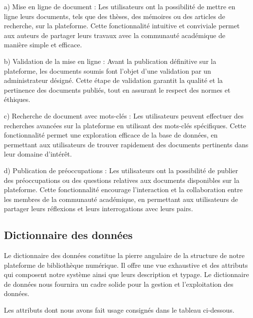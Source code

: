 a) Mise en ligne de document : Les utilisateurs ont la possibilité de mettre en ligne leurs documents, tels que des thèses, des mémoires ou des articles de recherche, sur la plateforme. Cette fonctionnalité intuitive et conviviale permet aux auteurs de partager leurs travaux avec la communauté académique de manière simple et efficace.\par


b) Validation de la mise en ligne : Avant la publication définitive sur la plateforme, les documents soumis font l'objet d'une validation par un administrateur désigné. Cette étape de validation garantit la qualité et la pertinence des documents publiés, tout en assurant le respect des normes et éthiques.\par

c) Recherche de document avec mots-clés : Les utilisateurs peuvent effectuer des recherches avancées sur la plateforme en utilisant des mots-clés spécifiques. Cette fonctionnalité permet une exploration efficace de la base de données, en permettant aux utilisateurs de trouver rapidement des documents pertinents dans leur domaine d'intérêt.\par

d) Publication de préoccupations : Les utilisateurs ont la possibilité de publier des préoccupations ou des questions relatives aux documents disponibles sur la plateforme. Cette fonctionnalité encourage l'interaction et la collaboration entre les membres de la communauté académique, en permettant aux utilisateurs de partager leurs réflexions et leurs interrogations avec leurs pairs.

\subsection{Dictionnaire des données}
Le dictionnaire des données constitue la pierre angulaire de la structure de notre plateforme de bibliothèque numérique. Il offre une vue exhaustive et des attributs qui composent notre système ainsi que leurs description et typage. Le dictionnaire de données nous fournira  un cadre solide pour la gestion et l'exploitation des données.\par
Les attributs dont nous avons fait usage  consignés dans le tableau ci-dessous.
\par 

